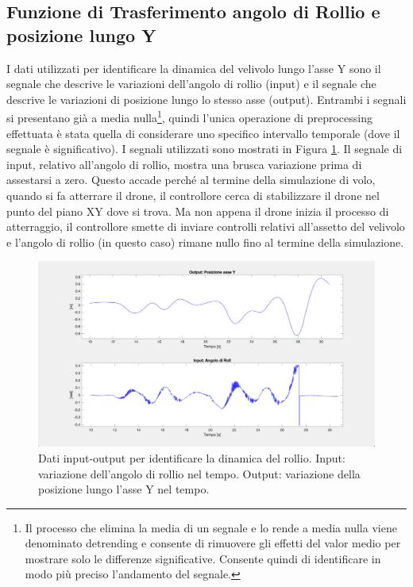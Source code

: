 \subsection{Funzione di Trasferimento angolo di Rollio e posizione lungo Y}
I dati utilizzati per identificare la dinamica del velivolo lungo l'asse Y sono il segnale che descrive le variazioni dell'angolo di rollio (input) e il segnale che descrive le variazioni di posizione lungo lo stesso asse (output). Entrambi i segnali si presentano già a media nulla\footnote{Il processo che elimina la media di un segnale e lo rende a media nulla viene denominato detrending e consente di rimuovere gli effetti del valor medio per mostrare solo le differenze significative. Consente quindi di identificare in modo più preciso l'andamento del segnale.}, quindi l'unica operazione di preprocessing effettuata è stata quella di considerare uno specifico intervallo temporale (dove il segnale è significativo). I segnali utilizzati sono mostrati in Figura \ref{fig:ry_input}. Il segnale di input, relativo all'angolo di rollio, mostra una brusca variazione prima di assestarsi a zero. Questo accade perché al termine della simulazione di volo, quando si fa atterrare il drone, il controllore cerca di stabilizzare il drone nel punto del piano XY dove si trova. Ma non appena il drone inizia il processo di atterraggio, il controllore smette di inviare controlli relativi all'assetto del velivolo e l'angolo di rollio (in questo caso) rimane nullo fino al termine della simulazione.

\begin{figure}[H]
	\centering
	\includegraphics[width=1\textwidth]{gfx/SysId/ry_input}
	\caption[Dati input-output per identificare la dinamica del rollio.]{Dati input-output per identificare la dinamica del rollio. Input: variazione dell'angolo di rollio nel tempo. Output: variazione della posizione lungo l'asse Y nel tempo.}
	\label{fig:ry_input}
\end{figure}

